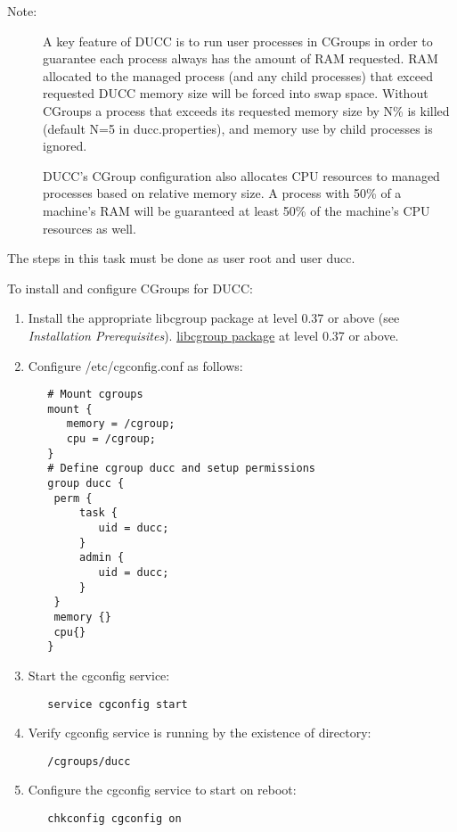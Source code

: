 \begin{description}
    \item[Note:] A key feature of DUCC is to run user processes in CGroups in order to guarantee
      each process always has the amount of RAM requested. RAM allocated to the managed process
      (and any child processes) that exceed requested DUCC memory size will be forced into swap space. 
      Without CGroups a process that exceeds its requested memory size by N\% is killed 
      (default N=5 in ducc.properties), and memory use by child processes is ignored.
      
      DUCC's CGroup configuration also allocates CPU resources to managed processes based on
      relative memory size. A process with 50\% of a machine's RAM will be guaranteed at least
      50\% of the machine's CPU resources as well. 
\end{description}

    The steps in this task must be done as user root and user ducc.

    To install and configure CGroups for DUCC:
    \begin{enumerate}
       \item Install the appropriate 
   \ifdefined\DUCCSTANDALONE
   libcgroup package at level 0.37 or above (see {\em Installation Prerequisites}).
   \else
   \hyperref[sec:install.prerequisites]{libcgroup package} at level 0.37 or above.
   \fi

       \item Configure /etc/cgconfig.conf as follows:
\begin{verbatim}
   # Mount cgroups
   mount {
      memory = /cgroup;
      cpu = /cgroup;
   }
   # Define cgroup ducc and setup permissions
   group ducc {
    perm {
        task {
           uid = ducc;
        }
        admin {
           uid = ducc;
        }
    }
    memory {}
    cpu{}
   }
\end{verbatim}
       \item Start the cgconfig service:
\begin{verbatim}
   service cgconfig start
\end{verbatim}
         
       \item Verify cgconfig service is running by the existence of directory: 
\begin{verbatim}
   /cgroups/ducc
\end{verbatim}

       \item Configure the cgconfig service to start on reboot:
\begin{verbatim}
   chkconfig cgconfig on
\end{verbatim}
    \end{enumerate}

